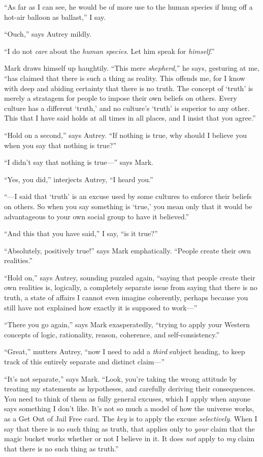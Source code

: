 {
 ``As far as I can see, he would be of more use to
the human species if hung off a hot-air balloon as
ballast,'' I say.}

{
 ``Ouch,'' says Autrey mildly.}

{
 ``I do not \textit{care} about the \textit{human
species}. Let him speak for \textit{himself}.''}

{
 Mark draws himself up haughtily. ``This mere
\textit{shepherd},'' he says, gesturing at me,
``has claimed that there is such a thing as reality.
This offends me, for I know with deep and abiding certainty that there
is no truth. The concept of `truth' is
merely a stratagem for people to impose their own beliefs on others.
Every culture has a different `truth,'
and no culture's `truth'
is superior to any other. This that I have said holds at all times in
all places, and I insist that you agree.''}

{
 ``Hold on a second,'' says
Autrey. ``If nothing is true, why should I believe you
when you say that nothing is true?''}

{
 ``I didn't say that nothing is
true---'' says Mark.}

{
 ``Yes, you did,'' interjects
Autrey, ``I heard you.''}

{
 ``---I said that
`truth' is an excuse used by some
cultures to enforce their beliefs on others. So when you say something
is `true,' you mean only that it would
be advantageous to your own social group to have it
believed.''}

{
 ``And this that you have
said,'' I say, ``is it
true?''}

{
 ``Absolutely, positively
true!'' says Mark emphatically.
``People create their own
realities.''}

{
 ``Hold on,'' says Autrey,
sounding puzzled again, ``saying that people create
their own realities is, logically, a completely separate issue from
saying that there is no truth, a state of affairs I cannot even imagine
coherently, perhaps because you still have not explained how exactly it
is supposed to work---''}

{
 ``There you go again,'' says
Mark exasperatedly, ``trying to apply your Western
concepts of logic, rationality, reason, coherence, and
self-consistency.''}

{
 ``Great,'' mutters Autrey,
``now I need to add a \textit{third} subject heading,
to keep track of this entirely separate and distinct
claim---''}

{
 ``It's not
separate,'' says Mark. ``Look,
you're taking the wrong attitude by treating my
statements as hypotheses, and carefully deriving their consequences.
You need to think of them as fully general excuses, which I apply when
anyone says something I don't like.
It's not so much a model of how the universe works, as
a Get Out of Jail Free card. The \textit{key} is to apply the excuse
\textit{selectively}. When I say that there is no such thing as truth,
that applies only to \textit{your} claim that the magic bucket works
whether or not I believe in it. It does \textit{not} apply to
\textit{my} claim that there is no such thing as
truth.''}

